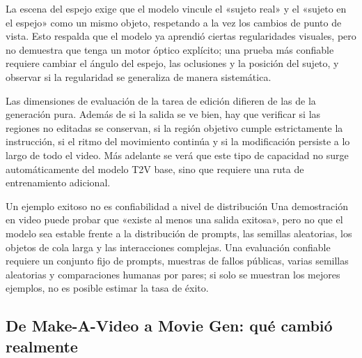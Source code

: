 
La escena del espejo exige que el modelo vincule el «sujeto real» y el «sujeto en el espejo» como un mismo objeto, respetando a la vez los cambios de punto de vista. Esto respalda que el modelo ya aprendió ciertas regularidades visuales, pero no demuestra que tenga un motor óptico explícito; una prueba más confiable requiere cambiar el ángulo del espejo, las oclusiones y la posición del sujeto, y observar si la regularidad se generaliza de manera sistemática.


Las dimensiones de evaluación de la tarea de edición difieren de las de la generación pura. Además de si la salida se ve bien, hay que verificar si las regiones no editadas se conservan, si la región objetivo cumple estrictamente la instrucción, si el ritmo del movimiento continúa y si la modificación persiste a lo largo de todo el video. Más adelante se verá que este tipo de capacidad no surge automáticamente del modelo T2V base, sino que requiere una ruta de entrenamiento adicional.

\begin{warningbox}{Un ejemplo exitoso no es confiabilidad a nivel de distribución}
Una demostración en video puede probar que «existe al menos una salida exitosa», pero no que el modelo sea estable frente a la distribución de prompts, las semillas aleatorias, los objetos de cola larga y las interacciones complejas. Una evaluación confiable requiere un conjunto fijo de prompts, muestras de fallos públicas, varias semillas aleatorias y comparaciones humanas por pares; si solo se muestran los mejores ejemplos, no es posible estimar la tasa de éxito.
\end{warningbox}


\subsection{De Make-A-Video a Movie Gen: qué cambió realmente}

